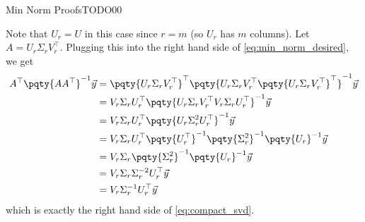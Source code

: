 \begin{problem}{Min Norm Proofs}{TODO}{0}{0}
\begin{problempartlist}
        \begin{solution}{0in}
            Note that $U_r = U$ in this case since $r = m$ (so $U_r$ has $m$ columns). Let $A = U_r \Sigma_r V_r^\top$. Plugging this into the right hand side of \cref{eq:min_norm_desired}, we get
            \begin{align}
                A^\top \pqty{A A^\top}^{-1} \vec{y} &= \pqty{U_r \Sigma_r V_r^\top}^{\top} \pqty{U_r \Sigma_r V_r^\top \pqty{U_r \Sigma_r V_r^\top}^{\top}}^{-1} \vec{y} \\
                &= V_r \Sigma_r U_r^\top \pqty{U_r \Sigma_r V_r^\top V_r \Sigma_r U_r^\top}^{-1} \vec{y} \\
                &= V_r \Sigma_r U_r^\top \pqty{U_r \Sigma_r^2 U_r^\top}^{-1} \vec{y} \\
                &= V_r \Sigma_r U_r^\top \pqty{U_r^\top}^{-1} \pqty{\Sigma_r^2}^{-1} \pqty{U_r}^{-1} \vec{y} \\
                &=  V_r \Sigma_r \pqty{\Sigma_r^2}^{-1} \pqty{U_r}^{-1} \vec{y} \\
                &= V_r \Sigma_r \Sigma_r^{-2} U_r^\top \vec{y} \\
                &= V_r \Sigma_r^{-1} U_r^\top \vec{y}
            \end{align}
            which is exactly the right hand side of \cref{eq:compact_svd}.
        \end{solution}
    \end{problempartlist}
\end{problem}